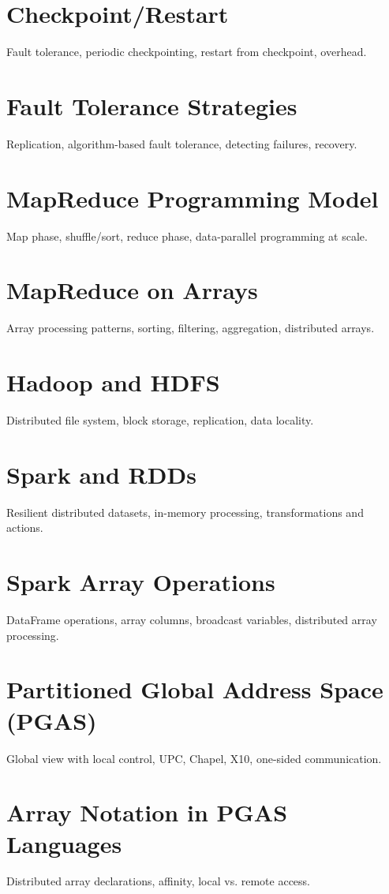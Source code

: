 \chapter{Checkpoint/Restart}
Fault tolerance, periodic checkpointing, restart from checkpoint, overhead.

\chapter{Fault Tolerance Strategies}
Replication, algorithm-based fault tolerance, detecting failures, recovery.

\chapter{MapReduce Programming Model}
Map phase, shuffle/sort, reduce phase, data-parallel programming at scale.

\chapter{MapReduce on Arrays}
Array processing patterns, sorting, filtering, aggregation, distributed arrays.

\chapter{Hadoop and HDFS}
Distributed file system, block storage, replication, data locality.

\chapter{Spark and RDDs}
Resilient distributed datasets, in-memory processing, transformations and actions.

\chapter{Spark Array Operations}
DataFrame operations, array columns, broadcast variables, distributed array processing.

\chapter{Partitioned Global Address Space (PGAS)}
Global view with local control, UPC, Chapel, X10, one-sided communication.

\chapter{Array Notation in PGAS Languages}
Distributed array declarations, affinity, local vs. remote access.

